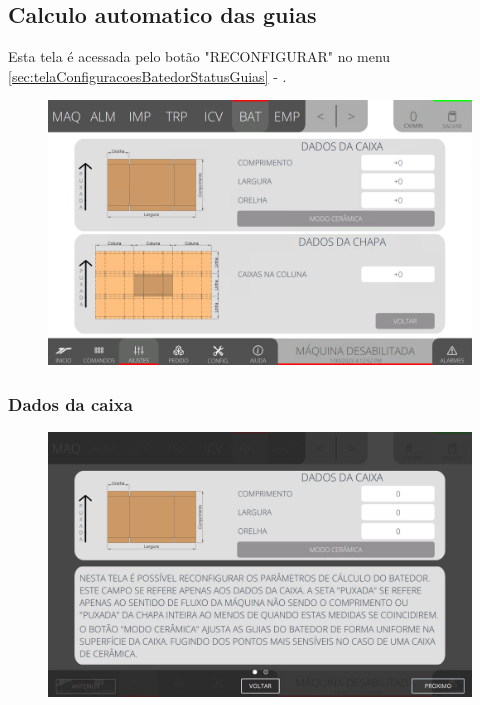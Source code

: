 \newpage
\thispagestyle{fancy}
\vspace*{40 pt}
\subsection{Calculo automatico das guias} \label{sec:telaCalculoAutomaticoGuias}
Esta tela é acessada pelo botão "RECONFIGURAR" no menu \ref{sec:telaConfiguracoesBatedorStatusGuias} - .
\vspace*{\fill}
\begin{figure}[h]
    \centering
    \includegraphics[width=480 px,height=300 px]{src/imagesICV/07-scout/settings/e-Tela-Principal-2.png}
\end{figure}
\vspace*{\fill}


\newpage
\thispagestyle{fancy}
\vspace*{40 pt}
\subsubsection{\small{Dados da caixa}} \label{sec:telaCalculoAutomaticoGuiasDadosCaixa}
\vspace*{\fill}
\begin{figure}[h]
    \centering
    \includegraphics[width=576 px,height=360 px]{src/imagesICV/07-scout/settings/e-6.png}
\end{figure}
\vspace*{\fill}

